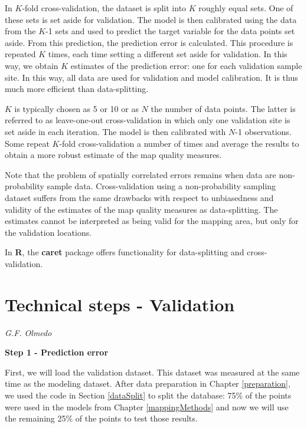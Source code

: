 \documentclass[10pt,b5paper,]{book}
\theoremstyle{definition}
\theoremstyle{definition}
\theoremstyle{definition}
\theoremstyle{remark}
\begin{document}
In \(K\)-fold cross-validation, the dataset is split into \(K\) roughly
equal sets. One of these sets is set aside for validation. The model is
then calibrated using the data from the \(K\)-1 sets and used to predict
the target variable for the data points set aside. From this prediction,
the prediction error is calculated. This procedure is repeated \(K\)
times, each time setting a different set aside for validation. In this
way, we obtain \(K\) estimates of the prediction error: one for each
validation sample site. In this way, all data are used for validation
and model calibration. It is thus much more efficient than
data-splitting.

\(K\) is typically chosen as 5 or 10 or as \(N\) the number of data
points. The latter is referred to as leave-one-out cross-validation in
which only one validation site is set aside in each iteration. The model
is then calibrated with \(N\)-1 observations. Some repeat \(K\)-fold
cross-validation a number of times and average the results to obtain a
more robust estimate of the map quality measures.

Note that the problem of spatially correlated errors remains when data
are non-probability sample data. Cross-validation using a
non-probability sampling dataset suffers from the same drawbacks with
respect to unbiasedness and validity of the estimates of the map quality
measures as data-splitting. The estimates cannot be interpreted as being
valid for the mapping area, but only for the validation locations.

In \textbf{R}, the \textbf{caret} package \citep{kuhn2016short} offers
functionality for data-splitting and cross-validation.

\hypertarget{TS:validation}{%
\section{Technical steps - Validation}\label{TS:validation}}

\emph{G.F. Olmedo}

\textbf{Step 1 - Prediction error}

First, we will load the validation dataset. This dataset was measured at
the same time as the modeling dataset. After data preparation in Chapter
\ref{preparation}, we used the code in Section \ref{dataSplit} to split
the database: 75\% of the points were used in the models from Chapter
\ref{mappingMethods} and now we will use the remaining 25\% of the
points to test those results.
\end{document}
